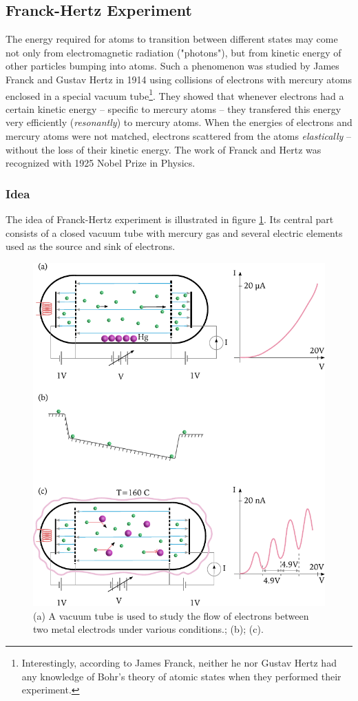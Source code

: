 \subsection{Franck-Hertz Experiment}
The energy required for atoms to transition between different states may come not only from electromagnetic radiation ("photons"), but from kinetic energy of other particles bumping into atoms. Such a phenomenon was studied by James Franck and Gustav Hertz in 1914 using collisions of electrons with mercury atoms enclosed in a special vacuum tube\footnote{Interestingly, according to James Franck, neither he nor Gustav Hertz had any knowledge of Bohr's theory of atomic states when they performed their experiment.}. They showed that whenever electrons had a certain kinetic energy -- specific to mercury atoms -- they transfered this energy very efficiently (\emph{resonantly}) to mercury atoms. When the energies of electrons and mercury atoms were not matched, electrons scattered from the atoms \emph{elastically} -- without the loss of their kinetic energy.  The work of Franck and Hertz was recognized with 1925 Nobel Prize in Physics.

\subsubsection*{Idea}
The idea of Franck-Hertz experiment is illustrated in figure \ref{fig:franckHertzExperiment}. Its central part consists of a closed vacuum tube with mercury gas and several electric elements used as the source and sink of electrons.
\begin{figure}[htbp]
	\centering
	\includegraphics[scale=1.0]{franckHertzExperiment}
	\caption{(a) A vacuum tube is used to study the flow of electrons between two metal electrods under various conditions.; (b); (c).}
	\label{fig:franckHertzExperiment}
\end{figure}


